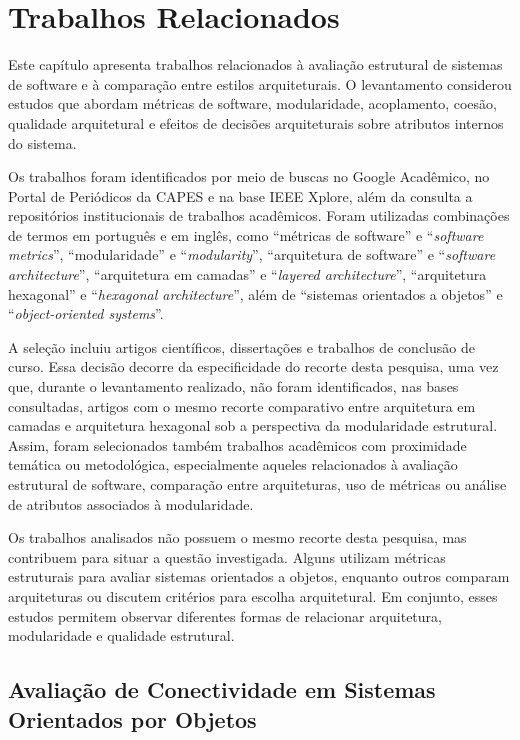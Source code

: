 \chapter{Trabalhos Relacionados}
\label{cap:trabalhos-relacionados}

Este capítulo apresenta trabalhos relacionados à avaliação estrutural de sistemas de software e à comparação entre estilos arquiteturais. 
O levantamento considerou estudos que abordam métricas de software, modularidade, acoplamento, coesão, qualidade arquitetural e efeitos 
de decisões arquiteturais sobre atributos internos do sistema.

Os trabalhos foram identificados por meio de buscas no Google Acadêmico, no Portal de Periódicos da CAPES e na base IEEE Xplore, além da 
consulta a repositórios institucionais de trabalhos acadêmicos. Foram utilizadas combinações de termos em português e em inglês, como 
``métricas de software'' e ``\textit{software metrics}'', ``modularidade'' e ``\textit{modularity}'', ``arquitetura de software'' e ``\textit{software architecture}'', 
``arquitetura em camadas'' e ``\textit{layered architecture}'', ``arquitetura hexagonal'' e ``\textit{hexagonal architecture}'', além de ``sistemas orientados 
a objetos'' e ``\textit{object-oriented systems}''.

A seleção incluiu artigos científicos, dissertações e trabalhos de conclusão de curso. Essa decisão decorre da especificidade do recorte 
desta pesquisa, uma vez que, durante o levantamento realizado, não foram identificados, nas bases consultadas, artigos com o mesmo recorte 
comparativo entre arquitetura em camadas e arquitetura hexagonal sob a perspectiva da modularidade estrutural. Assim, foram selecionados 
também trabalhos acadêmicos com proximidade temática ou metodológica, especialmente aqueles relacionados à avaliação estrutural de software, 
comparação entre arquiteturas, uso de métricas ou análise de atributos associados à modularidade.

Os trabalhos analisados não possuem o mesmo recorte desta pesquisa, mas contribuem para situar a questão investigada. Alguns utilizam 
métricas estruturais para avaliar sistemas orientados a objetos, enquanto outros comparam arquiteturas ou discutem critérios para escolha 
arquitetural. Em conjunto, esses estudos permitem observar diferentes formas de relacionar arquitetura, modularidade e qualidade estrutural.

\section{Avaliação de Conectividade em Sistemas Orientados por Objetos}
\label{sec:avaliacao-de-conectividade-em-sistemas-orientados-por-objetos}

